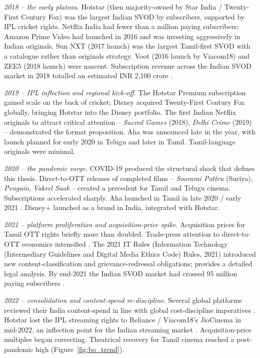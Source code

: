 \textit{2018 -- the early plateau}.  Hotstar (then majority-owned by
Star India / Twenty-First Century Fox) was the largest Indian SVOD by
subscribers, supported by IPL cricket rights.  Netflix India had
fewer than a million paying subscribers; Amazon Prime Video had
launched in 2016 and was investing aggressively in Indian originals.
Sun NXT (2017 launch) was the largest Tamil-first SVOD with a
catalogue rather than originals strategy.  Voot (2016 launch by
Viacom18) and ZEE5 (2018 launch) were nascent.  Subscription revenue
across the Indian SVOD market in 2018 totalled an estimated INR
2{,}100 crore \citep{ficciey2019}.

\textit{2019 -- IPL inflection and regional kick-off}.  The Hotstar
Premium subscription gained scale on the back of cricket; Disney
acquired Twenty-First Century Fox globally, bringing Hotstar into
the Disney portfolio.  The first Indian Netflix originals to attract
critical attention -- \emph{Sacred Games} (2018), \emph{Delhi Crime}
(2019) -- demonstrated the format proposition.  Aha was announced
late in the year, with launch planned for early 2020 in Telugu and
later in Tamil.  Tamil-language originals were minimal.

\textit{2020 -- the pandemic surge}.  COVID-19 produced the structural
shock that defines this thesis.  Direct-to-OTT releases of completed
films -- \emph{Soorarai Pottru} (Suriya), \emph{Penguin}, \emph{Vakeel
Saab} -- created a precedent for Tamil and Telugu cinema.
Subscriptions accelerated sharply.  Aha launched in Tamil in late
2020 / early 2021 \citep{aha2022launchreport}.  Disney+ launched as a
brand in India, integrated with Hotstar.

\textit{2021 -- platform proliferation and acquisition-price spike}.
Acquisition prices for Tamil OTT rights briefly more than doubled.
Trade-press attention to direct-to-OTT economics intensified
\citep{filmcompanion2021directott,variety2021directott}.  The
2021 IT Rules (Information Technology (Intermediary Guidelines and
Digital Media Ethics Code) Rules, 2021) introduced new content-classification
and grievance-redressal obligations; \citet{nayak2021} provides a
detailed legal analysis.  By end-2021 the Indian SVOD market had
crossed 95 million paying subscribers \citep{kpmg2022,ficciey2022}.

\textit{2022 -- consolidation and content-spend re-discipline}.
Several global platforms reviewed their India content-spend in line
with global cost-discipline imperatives \citep{economist2022netflix}.
Hotstar lost the IPL streaming rights to Reliance / Viacom18's
JioCinema in mid-2022, an inflection point for the Indian streaming
market \citep{economist2022jiocinema}.  Acquisition-price multiples
began correcting.  Theatrical recovery for Tamil cinema reached a
post-pandemic high (Figure~\ref{fig:bo_trend}).

